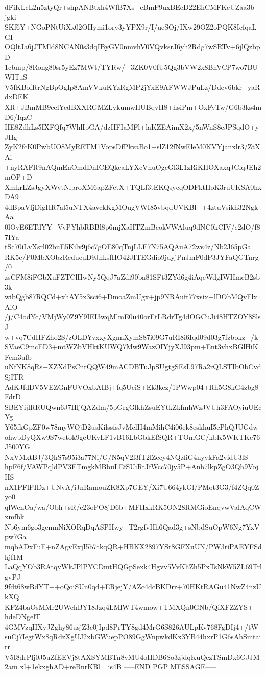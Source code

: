 dFiKLcL2n5ztyQr+shpANBtxh4WfB7Xs+cBmF9uxBEeD22EhCMFKeUZaa3b+jgki
SKf6Y+NGoPNtUiXx02OHymi1ory3yYPX9r/I/ueSOj/IXw29OZ2oPQK8IcfqaLGI
OQltJa6jJTMld8NCAN0s3dqIByGV0nmvhV0VQvksrJ6yh2Rdg7wSRTv+6jlQzbpD
1cbmp/8Rong80sr5yEz7MWt/TYRw/+3ZK0V0fU5Qg3bVW2x8BhVCP7wo7BUWITuS
V5fKBofRrNgBpOgIp8AmVVkuKYzRgMP2jYxE9AFWWJPuLz/Ddev6bkr+yaRdxDEK
XR+JBmMB9celYedBXXRGMZLykumwHUBqvH8+hsiPm+OxFyTw/G6b3ks4mD6/IqzC
HE8ZdhLs5IXFQfq7WhlIpGA/dzHFIaMFl+laKZEAimX2x/5nWnS8eJPSqdO+yJHg
ZyK2fcK0PwbUO8MyRETM1VopsDfPkvaBo1+slZ12fNwEleM0KVYjanxlr3/ZtXAi
+nyRAFR9nAQmEnOmdDnICEQkcaLYXcVhuOgcGl3L1zRiKHOXaxqJClqJEh2mOP+D
XmkrLZsJgyXWvtNlproXM6apZFetX+TQLf3tEKQsycqODFktHoK3ruUKSA0hxDA9
4dBpaVfjDigHR7al5uNTX4avckKgMOugVWI85vbqdUVKBl++4ztuVsikh32NgkAa
0lOvE6ETdYY+VvPYhbRBBl8p6mjXaHTZmBcokVWAluq9dNC0kCIV/c2dO/f87IYa
tSc70iLvXsrl02buE5Kilv9j6c7gOE80qTnjLLE7N75AQAuA72ws4z/Nb2J65pGa
RK5c/P0MbXObzRcdueuD9JnksfHO42JITEGdio9jdyjPnJmF0dP3JYFaQGTnrg/0
zsCFM8iFGbXuFZTClHwNy5QqJ7aZdi90ba81SFt3ZYd6g4iAqeWdgIWHmcB2sb3k
wibQgb87RQCd+xhAY5x3sci6+DmoaZmUgx+jp9NRAuft77xsix+lDObMQvFlxAiO
/j/C4odYc/VMjWy0Z9Y9IEI3wqMlmE0u40orFtLRdrTg4dOGCuJi48HTZOY8SlsJ
w+vq7CdHFZho2S/zOLDYvxxyXgnnXymS87i09G7uRI8i6Iqd09d03g7fzbokz+/k
SVaeC9mcED3+mtWZbVHktKUWQ7Mw9WazOIYjyXJ93pm+Ent3vhxBGlHiKFem3ufb
uNfNK8qRs+XZXdPsCnrQQW49mACDBTuJpSUgtgSEsL97Ra2rQLSTIbObCvdSjITR
AdKJfdDV5VEZGnFUVOxbAIBj+fq5UciS+Ek3kez/1PWwp04+Rh5G8kG4zbg8FdrD
SBEYijlRRUQwn6J7HljQAZdm/5pGrgGlkhZsuEYtkZkfmhWzJVUh3FAOyiuUEcYg
Y65fkGpZF0w78myWOjD2usKilssfsJvMclH4mMihC4i06ek8eskhuI5ePhQJUGdw
ohwbDyQXw9S7wetok9geUKvLF1vB16LbGbkEfSQR+TOmGC/kbK5WKTKe76J500YG
NxVMxtBJ/3QhS7s95i3a77Ni/G/N5qV2l3fT2lZecy4NQzfiG4nyykFa2vidU3lS
hpF6f/VAWPqldPV3ETmgkMBbuLEfSUiRtJfWcc70jy5P+Anb7lkpZgO3Qh9VojHS
nX1PFlPIDz+UNvA/iJnRamouZK8Xp7GEY/Xi7U664ykGl/PMot3G3/f4ZQq0Zyo0
qlWenOa/wa/Obh+sR/c23oPO8jD6b+MFHxkRK5ON28RMGioEnqvwValAqCWxmfbk
Nb6ym6go3gemnNiXORqDqASPHwy+T2rgfvHh6Qad3g+sNbdSuOpW6Ng7YxVpw7Ga
mqbADxFuF+nZAgvExjI5b7tkqQR+HBKX2897YSr8GFXuUN/PW3riPAEYFSdhjf1M
LaQqYOb3RAtqvWkJPlPYCDmtHQGpSexk4Hgvv5VvKhZh5PxTsNkW5ZL69TrlgvPJ
9fdt68wBdYT++oQoiSUn0qd+ERjejY/AZc4dcBKDrr+70HKtRAGu41NwZ4nzUkXQ
KFZ4baOsMMr2UWehBY18Jzq4LMlWT4wmow+TMXQn0GNb/QiXFZZYS++hdeDNgelT
4GMVzqIIXyJZghy86usjZ3c0jIpd8PrTY8gd4MrG6S826AULpKv768FgDIj4+/tW
suCj7IegtWx8qRdzXgUJ2xbGWuepPO89GgWnpwkdKx3YB44hxrP1G6sAhSmtairr
V5I8drPlj0J5uZfEEVj8tAXSYMBTn8vMU4oHDB6So3zjdqKuQezTSmDx6GJJM2am
xl+1ekxghAD+reBnrKBl
=is4B
-----END PGP MESSAGE-----
